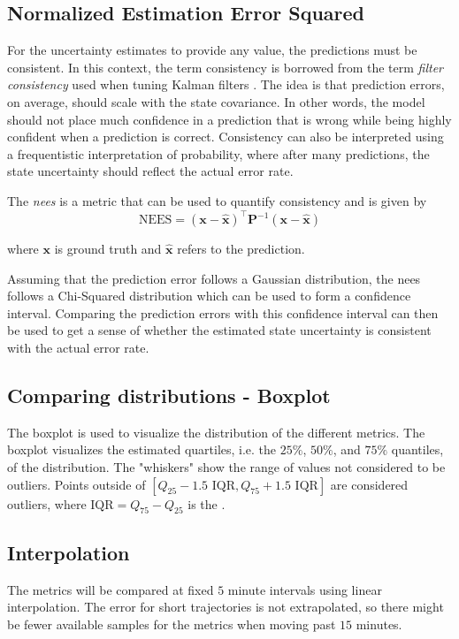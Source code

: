 \subsection{Normalized Estimation Error Squared}
For the uncertainty estimates to provide any value, the predictions must be consistent. In this context, the term consistency is borrowed from the term \textit{filter consistency} used when tuning Kalman filters \cite{sensorfusjon}. The idea is that prediction errors, on average, should scale with the state covariance. In other words, the model should not place much confidence in a prediction that is wrong while being highly confident when a prediction is correct. Consistency can also be interpreted using a frequentistic interpretation of probability, where after many predictions, the state uncertainty should reflect the actual error rate.

The \textit{\acrfull{nees}} is a metric that can be used to quantify consistency and is given by
\begin{equation}
    \text{NEES} = (\boldsymbol{x} - \hat{\boldsymbol{x}})^\intercal \boldsymbol{P}^{-1} (\boldsymbol{x} - \hat{\boldsymbol{x}})
\end{equation}

where $\boldsymbol{x}$ is ground truth and $\hat{\boldsymbol{x}}$ refers to the prediction.

Assuming that the prediction error follows a Gaussian distribution, the \acrshort{nees} follows a Chi-Squared distribution which can be used to form a confidence interval. Comparing the prediction errors with this confidence interval can then be used to get a sense of whether the estimated state uncertainty is consistent with the actual error rate.

\subsection{Comparing distributions - Boxplot}
The boxplot is used to visualize the distribution of the different metrics. The boxplot visualizes the estimated quartiles, i.e. the $25\%$, $50\%$, and $75\%$ quantiles, of the distribution. The "whiskers" show the range of values not considered to be outliers. Points outside of $[Q_{25} - 1.5 \text{ IQR}, Q_{75} + 1.5 \text{ IQR}]$ are considered outliers, where $\text{IQR} = Q_{75} - Q_{25}$ is the  \cite{matplotlib}.

\subsection{Interpolation}
The metrics will be compared at fixed $5$ minute intervals using linear interpolation. The error for short trajectories is not extrapolated, so there might be fewer available samples for the metrics when moving past $15$ minutes.

